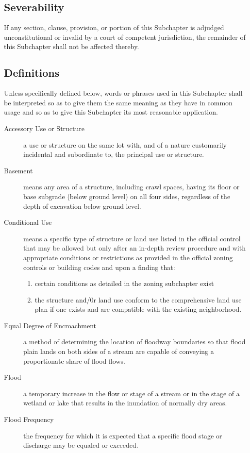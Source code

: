 \subsection{Severability}
If any section, clause, provision, or portion of this Subchapter is adjudged unconstitutional or invalid by a court of competent jurisdiction, the remainder of this Subchapter shall not be affected thereby.
\subsection{Definitions}
Unless specifically defined below, words or phrases used in this Subchapter shall be interpreted so as to give them the same meaning as they have in common usage and so as to give this Subchapter its most reasonable application.
\begin{description}
    \item[Accessory Use or Structure] a use or structure on the same lot with, and of a nature customarily incidental and subordinate to, the principal use or structure.
    \item[Basement] means any area of a structure, including crawl spaces, having its floor or base subgrade (below ground level) on all four sides, regardless of the depth of excavation below ground level.
    \item[Conditional Use] means a specific type of structure or land use listed in the official control that may be allowed but only after an in-depth review procedure and with appropriate conditions or restrictions as provided in the official zoning controls or building codes and upon a finding that:
        \begin{enumerate}[{\indent}a)]
            \item certain conditions as detailed in the zoning subchapter exist
            \item the structure and/0r land use conform to the comprehensive land use plan if one exists and are compatible with the existing neighborhood.
        \end{enumerate}
    \item[Equal Degree of Encroachment] a method of determining the location of floodway boundaries so that flood plain lands on both sides of a stream are capable of conveying a proportionate share of flood flows.
    \item[Flood] a temporary increase in the flow or stage of a stream or in the stage of a wetland or lake that results in the inundation of normally dry areas.
    \item[Flood Frequency] the frequency for which it is expected that a specific flood stage or discharge may be equaled or exceeded.

\end{description}

